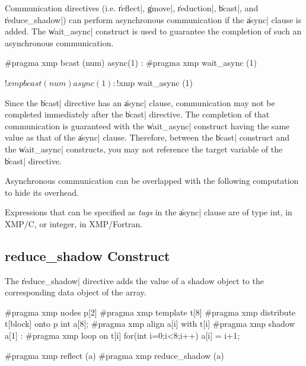 Communication directives (i.e. \|reflect|, \|gmove|, \|reduction|,
\|bcast|, and \|reduce_shadow|) can perform asynchronous communication if
the \|async| clause is added. The \|wait_async| construct is used to
guarantee the completion of such an asynchronous communication.

\begin{XCexample}
#pragma xmp bcast (num) async(1)
    :
#pragma xmp wait_async (1)
\end{XCexample}

\begin{XFexample}
!$xmp bcast (num) async(1)
        :
!$xmp wait_async (1)
\end{XFexample}

Since the \|bcast| directive has an \|async| clause, communication may
not be completed immediately after the \|bcast| directive. The
completion of that communication is guaranteed with the \|wait_async|
construct having the same value as that of the \|async| clause.
%
Therefore, between the \|bcast| construct and the \|wait_async|
constructs, you may not reference the target variable of the \|bcast|
directive.

\begin{myhint}
  Asynchronous communication can be overlapped with the following
  computation to hide its overhead.
\end{myhint}

\begin{mynote}
  Expressions that can be specified as {\it tags} in the \|async| clause are
  of type int, in XMP/C, or integer, in XMP/Fortran.
\end{mynote}


\subsection{{\bf reduce\_shadow} Construct}

The \|reduce_shadow| directive adds the value of a shadow object to the
corresponding data object of the array.

\begin{XCexample}
#pragma xmp nodes p[2]
#pragma xmp template t[8]
#pragma xmp distribute t[block] onto p
int a[8];
#pragma xmp align a[i] with t[i]
#pragma xmp shadow a[1]
 :
#pragma xmp loop on t[i]
  for(int i=0;i<8;i++)
    a[i] = i+1;

#pragma xmp reflect (a)
#pragma xmp reduce_shadow (a)
\end{XCexample}

